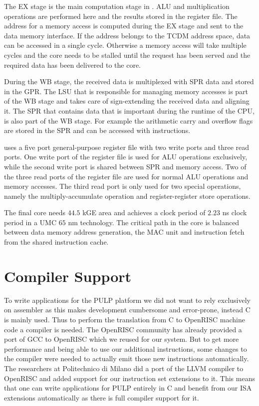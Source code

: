 The EX stage is the main computation stage in \orion. ALU and multiplication
operations are performed here and the results stored in the register file.
The address for a memory access is computed during the EX stage and sent to
the data memory interface.
If the address belongs to the \gls{TCDM} address space, data can be accessed in
a single cycle.
Otherwise a memory access will take multiple cycles and the core needs to be
stalled until the request has been served and the required data has been
delivered to the core.

During the \gls{WB} stage, the received data is multiplexed with \gls{SPR} data
and stored in the \gls{GPR}. The \gls{LSU} that is responsible for managing
memory accesses is part of the \gls{WB} stage and takes care of sign-extending
the received data and aligning it.
The \gls{SPR} that contains data that is important during the runtime of the
\gls{CPU}, is also part of the \gls{WB} stage. For example the arithmetic carry
and overflow flags are stored in the \gls{SPR} and can be accessed with
 instructions.

\orion uses a five port general-purpose register file with two write ports and
three read ports. One write port of the register file is used for ALU operations
exclusively, while the second write port is shared between SPR and memory
access. Two of the three read ports of the register file are used for normal \gls{ALU}
operations and memory accesses. The third read port is only used for two special
operations, namely the multiply-accumulate operation and register-register
store operations.

The final \orion core needs $44.5$ kGE area and achieves a clock period of
$2.23$ ns clock period in a UMC $65$ nm technology. The critical path in the
core is balanced between data memory address generation, the \gls{MAC} unit and
instruction fetch from the shared instruction cache.


\section{Compiler Support}

To write applications for the PULP platform we did not want to rely exclusively
on assembler as this makes development cumbersome and error-prone, instead C is
mainly used.
Thus to perform the translation from C to OpenRISC machine code a compiler is needed.
The OpenRISC community has already provided a port of \gls{GCC} to OpenRISC
which we reused for our system. But to get more performance and being able to
use our additional instructions, some changes to the compiler were needed to
actually emit those new instructions automatically. The researchers at
Politechnico di Milano did a port of the LLVM compiler to OpenRISC and added
support for our instruction set extensions to it.  This means that one can write
applications for PULP entirely in C and benefit from our \gls{ISA} extensions
automatically as there is full compiler support for it.

